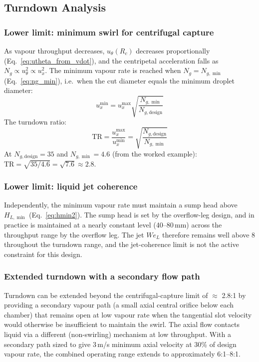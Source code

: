 \documentclass[11pt,letterpaper]{article}
\newcommand{\utheta}{u_{\theta}}
\newcommand{\ux}{u_{x}}
\newcommand{\Rc}{R_c}
\newcommand{\We}{\mathit{We}}
\begin{document}
\subsection{Turndown Analysis}
\label{sec:turndown}

\subsubsection{Lower limit: minimum swirl for centrifugal capture}

As vapour throughput decreases, $\utheta(\Rc)$ decreases proportionally
(Eq.~\ref{eq:utheta_from_vdot}), and the centripetal acceleration falls
as $N_g \propto \utheta^2 \propto \ux^2$.  The minimum vapour rate is
reached when $N_g = N_{g,\min}$ (Eq.~\ref{eq:ng_min}), i.e.\ when the
cut diameter equals the minimum droplet diameter:
\begin{equation}
  \ux^{\min} = \ux^{\max}\sqrt{\frac{N_{g,\min}}{N_{g,\mathrm{design}}}}
  \label{eq:ux_min}
\end{equation}
The turndown ratio:
\begin{equation}
  \mathrm{TR} = \frac{\ux^{\max}}{\ux^{\min}}
              = \sqrt{\frac{N_{g,\mathrm{design}}}{N_{g,\min}}}
  \label{eq:tr}
\end{equation}
At $N_{g,\mathrm{design}} = 35$ and $N_{g,\min} = 4.6$ (from the worked
example):
$\mathrm{TR} = \sqrt{35/4.6} = \sqrt{7.6} \approx 2.8$.

\subsubsection{Lower limit: liquid jet coherence}

Independently, the minimum vapour rate must maintain a sump head above
$H_{L,\min}$ (Eq.~\ref{eq:hmin2}).  The sump head is set by the
overflow-leg design, and in practice is maintained at a nearly constant
level (40--80\,mm) across the throughput range by the overflow leg.
The jet $\We_L$ therefore remains well above 8 throughout the turndown
range, and the jet-coherence limit is not the active constraint for this
design.

\subsubsection{Extended turndown with a secondary flow path}

Turndown can be extended beyond the centrifugal-capture limit of $\approx$
2.8:1 by providing a secondary vapour path (a small axial central orifice
below each chamber) that remains open at low vapour rate when the tangential
slot velocity would otherwise be insufficient to maintain the swirl.  The
axial flow contacts liquid via a different (non-swirling) mechanism at low
throughput.  With a secondary path sized to give 3\,m/s minimum axial
velocity at 30\% of design vapour rate, the combined operating range
extends to approximately 6:1--8:1.
\end{document}
